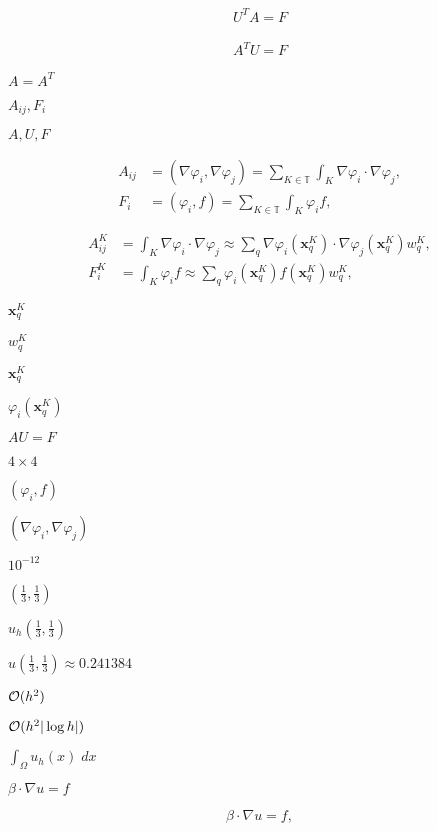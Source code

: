 \documentclass{article}
\begin{document}
\begin{align*} U^T A = F \end{align*}
\pagebreak

\begin{align*} A^T U = F \end{align*}
\pagebreak

$A=A^T$
\pagebreak

$A_{ij},F_i$
\pagebreak

$A,U,F$
\pagebreak

\begin{align*} A_{ij} &= (\nabla\varphi_i, \nabla \varphi_j) = \sum_{K \in {\mathbb T}} \int_K \nabla\varphi_i \cdot \nabla \varphi_j, \\ F_i &= (\varphi_i, f) = \sum_{K \in {\mathbb T}} \int_K \varphi_i f, \end{align*}
\pagebreak

\begin{align*} A^K_{ij} &= \int_K \nabla\varphi_i \cdot \nabla \varphi_j \approx \sum_q \nabla\varphi_i(\mathbf x^K_q) \cdot \nabla \varphi_j(\mathbf x^K_q) w_q^K, \\ F^K_i &= \int_K \varphi_i f \approx \sum_q \varphi_i(\mathbf x^K_q) f(\mathbf x^K_q) w^K_q, \end{align*}
\pagebreak

$\mathbf x^K_q$
\pagebreak

$w^K_q$
\pagebreak

$\mathbf x_q^K$
\pagebreak

$\varphi_i(\mathbf x^K_q)$
\pagebreak

$AU=F$
\pagebreak

$4\times 4$
\pagebreak

$(\varphi_i,f)$
\pagebreak

$(\nabla \varphi_i, \nabla \varphi_j)$
\pagebreak

$10^{-12}$
\pagebreak

$(\frac 13, \frac 13)$
\pagebreak

$u_h(\frac 13,\frac13)$
\pagebreak

$u(\frac 13, \frac 13)\approx 0.241384$
\pagebreak

${\cal O}(h^2)$
\pagebreak

${\cal O}(h^2 |\log h|)$
\pagebreak

$\int_\Omega u_h(x)\; dx$
\pagebreak

$\beta \cdot \nabla u = f$
\pagebreak

\[ \beta \cdot \nabla u = f, \]
\pagebreak
\end{document}
